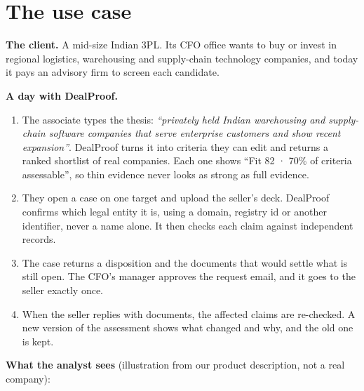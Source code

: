 \documentclass[11pt,a4paper]{article}
\begin{document}
\section{The use case}
\textbf{The client.} A mid-size Indian 3PL. Its CFO office wants to buy or invest in regional logistics, warehousing and supply-chain technology companies, and today it pays an advisory firm to screen each candidate.

\textbf{A day with DealProof.}
\begin{enumerate}
  \item The associate types the thesis: \emph{``privately held Indian warehousing and supply-chain software companies that serve enterprise customers and show recent expansion''}. DealProof turns it into criteria they can edit and returns a ranked shortlist of real companies. Each one shows ``Fit 82 · 70\% of criteria assessable'', so thin evidence never looks as strong as full evidence.
  \item They open a case on one target and upload the seller's deck. DealProof confirms which legal entity it is, using a domain, registry id or another identifier, never a name alone. It then checks each claim against independent records.
  \item The case returns a disposition and the documents that would settle what is still open. The CFO's manager approves the request email, and it goes to the seller exactly once.
  \item When the seller replies with documents, the affected claims are re-checked. A new version of the assessment shows what changed and why, and the old one is kept.
\end{enumerate}

\textbf{What the analyst sees} (illustration from our product description, not a real company):
\end{document}
